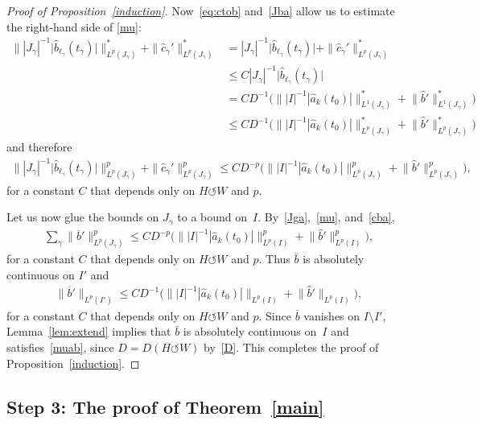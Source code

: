 \documentclass[11pt]{article}
\numberwithin{equation}{section}
\numberwithin{equation}{section}
\def\ga{\gamma}
\def\ol{\overline}
\def\we{\hat}
\def\acts{\circlearrowleft}
\begin{document}
\begin{proof}[Proof of Proposition~\ref{induction}]
{}


Now~\eqref{eq:ctob} and~\eqref{Jba} allow us to estimate the right-hand side of
\eqref{mu}:
\begin{align*}
 \big\||J_\ga|^{-1} \big|\hat b_{\ell_\ga}(t_\ga)\big| \big\|^*_{L^p (J_\ga)}
 + \|\hat c_{\ga}'\|^*_{L^p (J_\ga)}
 &= |J_\ga|^{-1} \big|\hat b_{\ell_\ga}(t_\ga)\big| +
 \|\hat c_{\ga}'\|^*_{L^p (J_\ga)}
 \\
 &\le C |J_\ga|^{-1} \big|\hat b_{\ell_\ga}(t_\ga)\big|
 \\
 &= C D^{-1} \Big( \big\| |I|^{-1} {|\hat a_k(t_0)|} \big\|^*_{L^1 (J_\ga)}
 + \big\|\hat b'\big\|^*_{L^1 (J_\ga)}\Big)
 \\
 &\le C D^{-1} \Big( \big\| |I|^{-1} {|\hat a_k(t_0)|} \big\|^*_{L^p (J_\ga)}
 + \big\|\hat b'\big\|^*_{L^p (J_\ga)}\Big)
\end{align*}
and therefore
\begin{gather}
\big \||J_\ga|^{-1} \big|\hat b_{\ell_\ga}(t_\ga)\big|\big \|^p_{L^p (J_\ga)}
 + \|\hat c_{\ga}'\|^p_{L^p (J_\ga)}
 \le C D^{-p} \Big( \big\| |I|^{-1} {|\hat a_k(t_0)|} \big\|^p_{L^p (J_\ga)}
 + \big\|\hat b'\big\|^p_{L^p (J_\ga)}\Big), \label{cba}
\end{gather}
for a constant $C$ that depends only on $H \acts W$ and $p$.




Let us now glue the bounds on $J_\ga$ to a bound on~$I$. By~\eqref{Jga},~\eqref{mu}, and~\eqref{cba},
\begin{gather*} %
 \sum_\ga \big\|\ol b'\big\|^p_{L^p(J_\ga)}
 \le C D^{-p} \Big( \big\| |I|^{-1} {|\hat a_k(t_0)|} \big\|^p_{L^p (I)}
 + \big\|\we b'\big\|^p_{L^p (I)}\Big),
\end{gather*}
for a constant $C$ that depends only on $H \acts W$ and $p$.
Thus $\ol b$ is absolutely continuous on $I'$
and
\begin{gather*}
 \big\|\ol b'\big\|_{L^p(I')}
 \le C D^{-1} \Big( \big\| |I|^{-1} {|\we a_k(t_0)|} \big\|_{L^p (I)}
 + \big\|\we b'\big\|_{L^p (I)}\Big),
\end{gather*}
for a constant $C$ that depends only on $H \acts W$ and $p$.
Since $\ol b$ vanishes on $I \setminus I'$,
Lemma~\ref{lem:extend} implies that $\ol b$ is absolutely continuous on~$I$ and
satisfies~\eqref{muab}, since $D = D(H \acts W)$ by~\eqref{D}.
This completes the proof of Proposition~\ref{induction}.
\end{proof}

\subsection*{Step 3: The proof of Theorem~\ref{main}}
\end{document}
